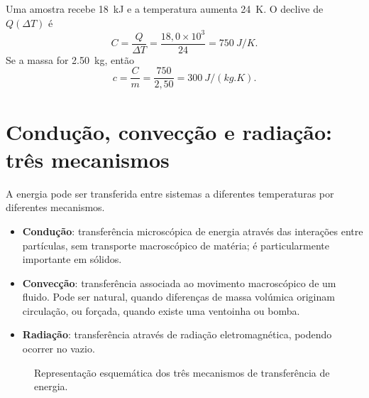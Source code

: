\documentclass[11pt,a4paper,oneside]{book}
\begin{document}
\begin{exemplo}[title=Exemplo resolvido -- capacidade térmica a partir do gráfico]
Uma amostra recebe \SI{18}{kJ} e a temperatura aumenta \SI{24}{K}. O declive de $Q(\Delta T)$ é
\[
C=\frac{Q}{\Delta T}=\frac{18{,}0\times10^3}{24}=\SI{750}{J/K}.
\]
Se a massa for \SI{2.50}{kg}, então
\[
c=\frac{C}{m}=\frac{750}{2{,}50}=\SI{300}{J/(kg.K)}.
\]
\end{exemplo}

\section{Condução, convecção e radiação: três mecanismos}
A energia pode ser transferida entre sistemas a diferentes temperaturas por diferentes mecanismos.
\begin{itemize}
  \item \textbf{Condução}: transferência microscópica de energia através das interações entre partículas, sem transporte macroscópico de matéria; é particularmente importante em sólidos.
  \item \textbf{Convecção}: transferência associada ao movimento macroscópico de um fluido. Pode ser natural, quando diferenças de massa volúmica originam circulação, ou forçada, quando existe uma ventoinha ou bomba.
  \item \textbf{Radiação}: transferência através de radiação eletromagnética, podendo ocorrer no vazio.
\end{itemize}

\begin{figure}[H]
\centering
{}
\caption{Representação esquemática dos três mecanismos de transferência de energia.}
\end{figure}
\end{document}
